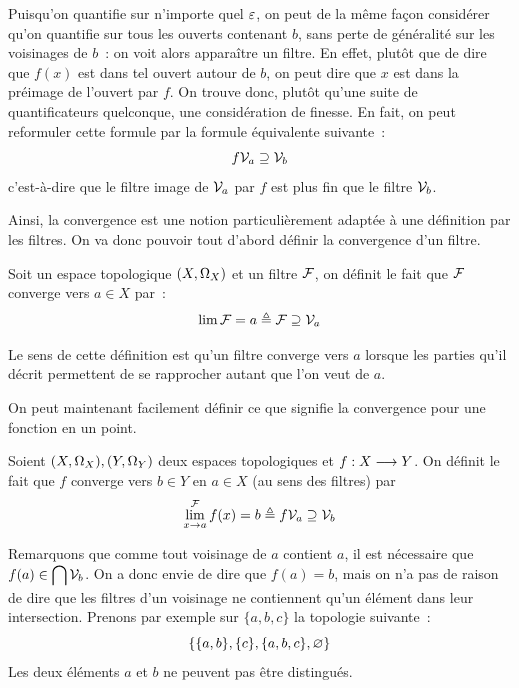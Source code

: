 Puisqu'on quantifie sur n'importe quel $\varepsilon$, on peut de la même façon
considérer qu'on quantifie sur tous les ouverts contenant $b$, sans perte de
généralité sur les voisinages de $b$~: on voit alors apparaître un filtre.
En effet, plutôt que de dire que $f(x)$ est dans tel ouvert autour de $b$,
on peut dire que $x$ est dans la préimage de l'ouvert par $f$. On trouve donc,
plutôt qu'une suite de quantificateurs quelconque, une considération de
finesse. En fait, on peut reformuler cette formule par la formule équivalente
suivante~:
\[f\mathcal{V}_{a} \supseteq \mathcal{V}_{b}\]
c'est-à-dire que le filtre image de $\mathcal{V}_{a}$ par $f$ est plus fin que le
filtre $\mathcal{V}_{b}$.

Ainsi, la convergence est une notion particulièrement adaptée à une définition
par les filtres. On va donc pouvoir tout d'abord définir la convergence d'un
filtre.

\begin{definition}
  Soit un espace topologique $(X,\Omega_{X})$ et un filtre $\mathcal{F}$, on
  définit le fait que $\mathcal{F}$ converge vers $a\in X$ par~:
  \[\lim \mathcal{F} = a \triangleq \mathcal{F} \supseteq \mathcal{V}_{a}\]
\end{definition}

Le sens de cette définition est qu'un filtre converge vers $a$ lorsque les
parties qu'il décrit permettent de se rapprocher autant que l'on veut de
$a$.

On peut maintenant facilement définir ce que signifie la convergence pour une
fonction en un point.

\begin{definition}
  Soient $(X,\Omega_{X}),(Y,\Omega_{Y})$ deux espaces topologiques et
  $f : \displaystyle X \longrightarrow Y$. On définit le fait que $f$ converge vers $b\in Y$ en
  $a\in X$ (au sens des filtres) par
  \[\lim^{\mathcal{F}}_{x\to a}f(x) = b\triangleq f\mathcal{V}_{a} \supseteq\mathcal{V}_{b}\]
\end{definition}

Remarquons que comme tout voisinage de $a$ contient $a$, il est nécessaire que
$\displaystyle f(a)\in\bigcap\mathcal{V}_{b}$. On a donc envie de dire que $f(a)=b$,
mais on n'a pas de raison de dire  que les filtres d'un
voisinage ne contiennent qu'un élément dans leur intersection. Prenons par
exemple sur $\{a,b,c\}$ la topologie  suivante~:
\[\{\{a,b\},\{c\},\{a,b,c\},\varnothing\}\]
Les deux éléments $a$ et $b$ ne peuvent pas être distingués.

